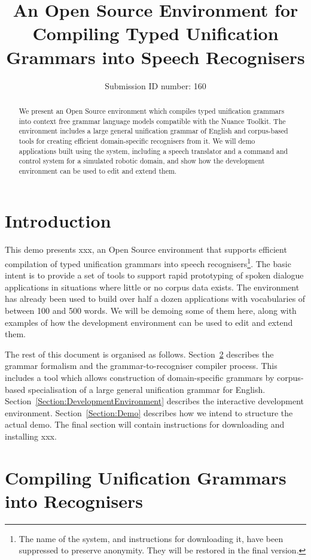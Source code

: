\documentclass[11pt,twoside]{article}
\title{An Open Source Environment for Compiling Typed Unification Grammars into Speech Recognisers}
\author{Submission ID number: 160}
\date{}
\begin{document}
\maketitle
\begin{abstract}
We present an Open Source environment which compiles typed
unification grammars into context free grammar language models
compatible with the Nuance Toolkit.  The environment includes a large
general unification grammar of English and corpus-based tools for
creating efficient domain-specific recognisers from it. We will demo
applications built using the system, including a speech translator and
a command and control system for a simulated robotic domain, and show
how the development environment can be used to edit and extend them.
\end{abstract}

\section{Introduction}

This demo presents {\sc xxx}, an Open Source environment that supports
efficient compilation of typed unification grammars into speech
recognisers\footnote{The name of the system, and instructions for
downloading it, have been suppressed to preserve anonymity. They will
be restored in the final version.}. The basic intent is to provide a
set of tools to support rapid prototyping of spoken dialogue
applications in situations where little or no corpus data exists. The
environment has already been used to build over half a dozen applications
with vocabularies of between 100 and 500 words. We will be demoing some
of them here, along with examples of how the development environment
can be used to edit and extend them.

The rest of this document is organised as
follows. Section~\ref{Section:Compilation} describes the grammar
formalism and the grammar-to-recogniser compiler process. This includes a
tool which allows construction of domain-specific grammars by
corpus-based specialisation of a large general unification grammar for
English. Section~\ref{Section:DevelopmentEnvironment} describes the
interactive development environment. Section~\ref{Section:Demo} describes
how we intend to structure the actual demo. The final section
will contain instructions for downloading and installing {\sc xxx}.

\section{Compiling Unification Grammars into Recognisers}
\label{Section:Compilation}
\end{document}
